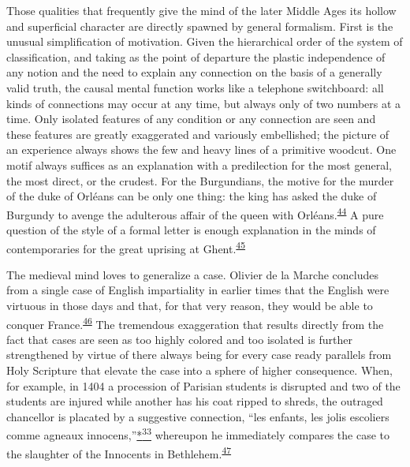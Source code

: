 Those qualities that frequently give the mind of the later Middle Ages
its hollow and superficial character are directly spawned by general
formalism. First is the unusual simplification of motivation. Given the
hierarchical order of the system of classification, and taking as the
point of departure the plastic independence of any notion and the need
to explain any connection on the basis of a generally valid truth, the
causal mental function works like a telephone switchboard: all kinds of
connections may occur at any time,
\protect\hypertarget{18_Chapter_Eleven__THE_FORMS_OF_THO.xhtmlux5cux23page_282}{}{}but
always only of two numbers at a time. Only isolated features of any
condition or any connection are seen and these features are greatly
exaggerated and variously embellished; the picture of an experience
always shows the few and heavy lines of a primitive woodcut. One motif
always suffices as an explanation with a predilection for the most
general, the most direct, or the crudest. For the Burgundians, the
motive for the murder of the duke of Orléans can be only one thing: the
king has asked the duke of Burgundy to avenge the adulterous affair of
the queen with
Orléans.\textsuperscript{\protect\hypertarget{18_Chapter_Eleven__THE_FORMS_OF_THO.xhtmlux5cux23id_545}{\protect\hyperlink{23_NOTES.xhtmlux5cux23id_546}{44}}}
A pure question of the style of a formal letter is enough explanation in
the minds of contemporaries for the great uprising at
Ghent.\textsuperscript{\protect\hypertarget{18_Chapter_Eleven__THE_FORMS_OF_THO.xhtmlux5cux23id_543}{\protect\hyperlink{23_NOTES.xhtmlux5cux23id_544}{45}}}

The medieval mind loves to generalize a case. Olivier de la Marche
concludes from a single case of English impartiality in earlier times
that the English were virtuous in those days and that, for that very
reason, they would be able to conquer
France.\textsuperscript{\protect\hypertarget{18_Chapter_Eleven__THE_FORMS_OF_THO.xhtmlux5cux23id_541}{\protect\hyperlink{23_NOTES.xhtmlux5cux23id_542}{46}}}
The tremendous exaggeration that results directly from the fact that
cases are seen as too highly colored and too isolated is further
strengthened by virtue of there always being for every case ready
parallels from Holy Scripture that elevate the case into a sphere of
higher consequence. When, for example, in 1404 a procession of Parisian
students is disrupted and two of the students are injured while another
has his coat ripped to shreds, the outraged chancellor is placated by a
suggestive connection, ``les enfants, les jolis escoliers comme agneaux
innocens,''\protect\hypertarget{18_Chapter_Eleven__THE_FORMS_OF_THO.xhtmlux5cux23id_2629}{\protect\hyperlink{23_NOTES.xhtmlux5cux23id_2630}{*\textsuperscript{33}}}
whereupon he immediately compares the case to the slaughter of the
Innocents in
Bethlehem.\textsuperscript{\protect\hypertarget{18_Chapter_Eleven__THE_FORMS_OF_THO.xhtmlux5cux23id_539}{\protect\hyperlink{23_NOTES.xhtmlux5cux23id_540}{47}}}

